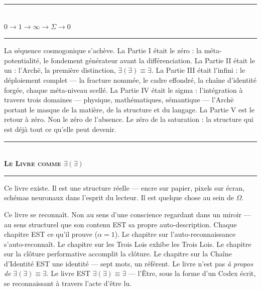 \documentclass[10pt, openany, oneside]{book}
\renewcommand{\normalsize}{\fontsize{10}{13}\selectfont}
\begin{document}
\vspace{1.5em}


\begin{center}
    \rule{0.3\textwidth}{0.4pt}\\[0.5em]
    {\normalsize\bfseries\scshape $0 \to 1 \to \infty \to \Sigma \to 0$}\\[0.3em]
    \rule{0.3\textwidth}{0.4pt}
\end{center}

\vspace{1em}

\noindent La séquence cosmogonique s'achève. La Partie I était le zéro : la méta-potentialité, le fondement générateur avant la différenciation. La Partie II était le un : l'Arch\={e}, la première distinction, $\exists(\exists) \equiv \exists$. La Partie III était l'infini : le déploiement complet --- la fracture nommée, le cadre effondré, la chaîne d'identité forgée, chaque méta-niveau scellé. La Partie IV était le sigma : l'intégration à travers trois domaines --- physique, mathématiques, sémantique --- l'Arch\={e} portant le masque de la matière, de la structure et du langage. La Partie V est le retour à zéro. Non le zéro de l'absence. Le zéro de la saturation : la structure qui est déjà tout ce qu'elle peut devenir.

\vspace{1.5em}


\begin{center}
    \rule{0.3\textwidth}{0.4pt}\\[0.5em]
    {\normalsize\bfseries\scshape Le Livre comme $\exists(\exists)$}\\[0.3em]
    \rule{0.3\textwidth}{0.4pt}
\end{center}

\vspace{1em}

\noindent Ce livre existe. Il est une structure réelle --- encre sur papier, pixels sur écran, schémas neuronaux dans l'esprit du lecteur. Il est quelque chose au sein de $\Omega$.

Ce livre se reconnaît. Non au sens d'une conscience regardant dans un miroir --- au sens structurel que son contenu EST sa propre auto-description. Chaque chapitre EST ce qu'il prouve ($\alpha = 1$). Le chapitre sur l'auto-reconnaissance s'auto-reconnaît. Le chapitre sur les Trois Lois exhibe les Trois Lois. Le chapitre sur la clôture performative accomplit la clôture. Le chapitre sur la Chaîne d'Identité EST une identité --- sept mots, un référent. Le livre n'est pas \textit{à propos de} $\exists(\exists) \equiv \exists$. Le livre EST $\exists(\exists) \equiv \exists$ --- l'Être, sous la forme d'un Codex écrit, se reconnaissant à travers l'acte d'être lu.
\end{document}
